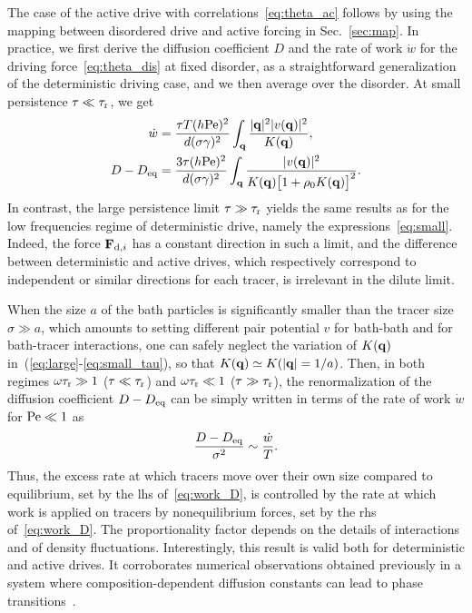 \documentclass[superscriptaddress, twocolumn, prx, longbibliography, nofootinbib]{revtex4-1}
\begin{document}
The case of the active drive with correlations~\eqref{eq:theta_ac} follows by using the mapping between disordered drive and active forcing in Sec.~\ref{sec:map}. In practice, we first derive the diffusion coefficient $D$ and the rate of work $\dot w$ for the driving force~\eqref{eq:theta_dis} at fixed disorder, as a straightforward generalization of the deterministic driving case, and we then average over the disorder. At small persistence $\tau\ll\tau_{\rm r}$, we get
\begin{equation}\label{eq:small_tau}
	\begin{aligned}
		\dot w &=  \frac{\tau T(h{\rm Pe})^2}{d(\sigma\gamma)^2} \int_{\bf q} \frac{|{\bf q}|^2 |v({\bf q})|^2}{K({\bf q})} ,
		\\
		D-D_{\rm eq} &= \frac{3\tau(h{\rm Pe})^2}{d(\sigma\gamma)^2} \int_{\bf q}\frac{|v({\bf q})|^2 } {K({\bf q})\big[1 + \rho_0 K({\bf q})\big]^2} .
	\end{aligned}
\end{equation}
In contrast, the large persistence limit $\tau\gg\tau_{\rm r}$ yields the same results as for the low frequencies regime of deterministic drive, namely the expressions~\eqref{eq:small}. Indeed, the force ${\bf F}_{{\rm d},i}$ has a constant direction in such a limit, and the difference between deterministic and active drives, which respectively correspond to independent or similar directions for each tracer, is irrelevant in the dilute limit.


When the size $a$ of the bath particles is significantly smaller than the tracer size $\sigma\gg a$, which amounts to setting different pair potential $v$ for bath-bath and for bath-tracer interactions, one can safely neglect the variation of $K({\bf q})$ in~(\ref{eq:large}-\ref{eq:small_tau}), so that $K({\bf q}) \simeq K(|{\bf q}|=1/a)$. Then, in both regimes $\omega\tau_{\rm r}\gg 1$ ($\tau\ll\tau_{\rm r}$) and $\omega\tau_{\rm r}\ll 1$ ($\tau\gg\tau_{\rm r}$), the renormalization of the diffusion coefficient $D-D_{\rm eq}$ can be simply written in terms of the rate of work $\dot w$ for ${\rm Pe}\ll1$ as
\begin{equation}\label{eq:work_D}
	\frac{D-D_{\rm eq}}{\sigma^2} \sim \frac{\dot w}{T} .
\end{equation}
Thus, the excess rate at which tracers move over their own size compared to equilibrium, set by the lhs of~\eqref{eq:work_D}, is controlled by the rate at which work is applied on tracers by nonequilibrium forces, set by the rhs of~\eqref{eq:work_D}. The proportionality factor depends on the details of interactions and of density fluctuations. Interestingly, this result is valid both for deterministic and active drives. It corroborates numerical observations obtained previously in a system where composition-dependent diffusion constants can lead to phase transitions~\cite{delJunco2018}.
\end{document}
